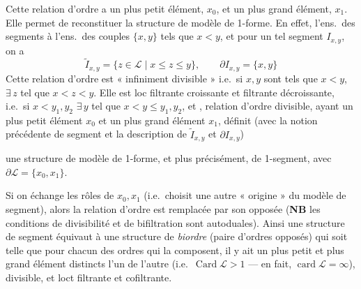 \documentclass[11pt,a4paper]{article}
\begin{document}
Cette relation d'ordre a un plus petit élément, $x_0$, et un plus grand élément, $x_1$. Elle permet de reconstituer la structure de modèle de 1-forme. En effet, l'ens.\ des segments   à l'ens.\ des couples $\{x,y\}$ tels que $x < y$, et pour un tel segment $I_{x,y}$, on a
\[
  \widetilde{I}_{x,y} = \lbrace z \in \mathcal{L} \mid x \leq z \leq y \rbrace, \qquad \partial I_{x,y} = \{x,y\}
\]
Cette relation d'ordre est « infiniment divisible » i.e.\ si $x, y$ sont tels que $x < y$, $\exists\, z$ tel que $x < z < y$. Elle est loc filtrante croissante et filtrante décroissante, i.e.\ si $x < y_1, y_2$ $\exists\, y$ tel que $x < y \leq y_1, y_2$, et  ,  relation d'ordre divisible,  ayant un plus petit élément \struck{\ill{}} $x_0$ et un plus grand élément $x_1$, définit (avec la notion précédente de segment  et la description de $\widetilde{I}_{x,y}$ et $\partial I_{x,y}$)

une structure de modèle de 1-forme, et plus précisément, de 1-segment, avec $\partial\mathcal{L} = \{x_0,x_1\}$.

Si on échange les rôles de $x_0, x_1$ (i.e.\ choisit une autre « origine » du modèle de segment), alors la relation d'ordre est remplacée par son opposée (\textbf{NB} les conditions de divisibilité et de bifiltration  sont autoduales). Ainsi une structure de  segment équivaut à une structure de \emph{biordre} (paire d'ordres opposés) qui soit telle que pour chacun  des ordres qui la composent, il y ait un plus petit et plus grand élément distincts l'un de l'autre (i.e.\ $\operatorname{Card} \mathcal{L} > 1$ --- en fait, $\operatorname{card} \mathcal{L} = \infty$), divisible, et loct filtrante et cofiltrante.
\end{document}
